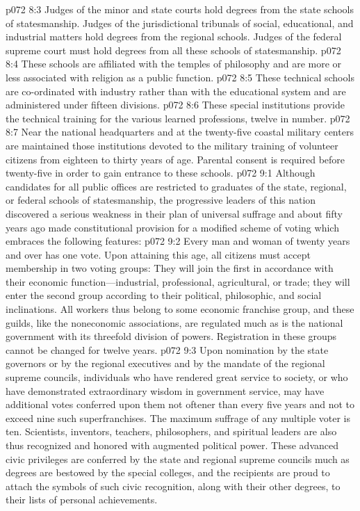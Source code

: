 \vs p072 8:3 Judges of the minor and state courts hold degrees from the state schools of statesmanship. Judges of the jurisdictional tribunals of social, educational, and industrial matters hold degrees from the regional schools. Judges of the federal supreme court must hold degrees from all these schools of statesmanship.
\pc \vs p072 8:4 \bibnobreakspace {} These schools are affiliated with the temples of philosophy and are more or less associated with religion as a public function.
\pc \vs p072 8:5 \bibnobreakspace {} These technical schools are co\hyp{}ordinated with industry rather than with the educational system and are administered under fifteen divisions.
\pc \vs p072 8:6 \bibnobreakspace {} These special institutions provide the technical training for the various learned professions, twelve in number.
\pc \vs p072 8:7 \bibnobreakspace {} Near the national headquarters and at the twenty\hyp{}five coastal military centers are maintained those institutions devoted to the military training of volunteer citizens from eighteen to thirty years of age. Parental consent is required before twenty\hyp{}five in order to gain entrance to these schools.\plusone
{}
\vs p072 9:1 Although candidates for all public offices are restricted to graduates of the state, regional, or federal schools of statesmanship, the progressive leaders of this nation discovered a serious weakness in their plan of universal suffrage and about fifty years ago made constitutional provision for a modified scheme of voting which embraces the following features:
\pc \vs p072 9:2 \bibnobreakspace Every man and woman of twenty years and over has one vote. Upon attaining this age, all citizens must accept membership in two voting groups: They will join the first in accordance with their economic function---industrial, professional, agricultural, or trade; they will enter the second group according to their political, philosophic, and social inclinations. All workers thus belong to some economic franchise group, and these guilds, like the noneconomic associations, are regulated much as is the national government with its threefold division of powers. Registration in these groups cannot be changed for twelve years.
\pc \vs p072 9:3 \bibnobreakspace Upon nomination by the state governors or by the regional executives and by the mandate of the regional supreme councils, individuals who have rendered great service to society, or who have demonstrated extraordinary wisdom in government service, may have additional votes conferred upon them not oftener than every five years and not to exceed nine such superfranchises. The maximum suffrage of any multiple voter is ten. Scientists, inventors, teachers, philosophers, and spiritual leaders are also thus recognized and honored with augmented political power. These advanced civic privileges are conferred by the state and regional supreme councils much as degrees are bestowed by the special colleges, and the recipients are proud to attach the symbols of such civic recognition, along with their other degrees, to their lists of personal achievements.
